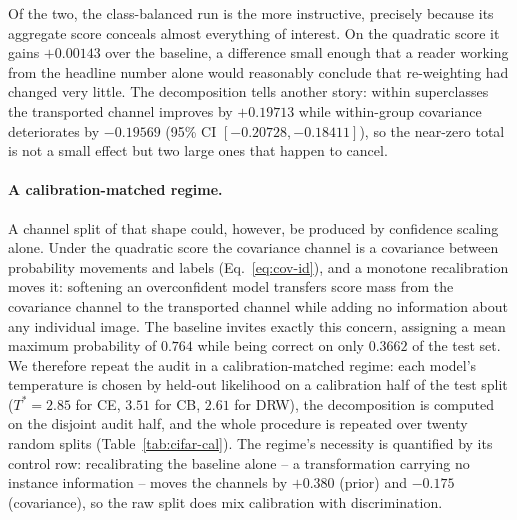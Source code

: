 Of the two, the class-balanced run is the more instructive, precisely because its
aggregate score conceals almost everything of interest. On the quadratic score it gains
$+0.00143$ over the baseline, a difference small enough that a reader working from the
headline number alone would reasonably conclude that re-weighting had changed very
little. The decomposition tells another story: within superclasses the
transported channel improves by $+0.19713$ while within-group covariance deteriorates
by $-0.19569$ (95\% CI $[-0.20728,-0.18411]$), so the near-zero total is not a small
effect but two large ones that happen to cancel.

\paragraph{A calibration-matched regime.} A channel split of that shape could, however,
be produced by confidence scaling alone. Under the quadratic score the covariance channel
is a covariance between probability movements and labels
(Eq.~\eqref{eq:cov-id}), and a monotone recalibration moves it: softening an
overconfident model transfers score mass from the covariance channel to the transported channel while
adding no information about any individual image. The baseline invites exactly this
concern, assigning a mean maximum probability of $0.764$ while being correct on only
$0.3662$ of the test set. We therefore repeat the audit in a calibration-matched regime:
each model's temperature is chosen by held-out likelihood on a calibration half of the
test split ($T^*=2.85$ for CE, $3.51$ for CB, $2.61$ for DRW), the decomposition is
computed on the disjoint audit half, and the whole procedure is repeated over twenty
random splits (Table~\ref{tab:cifar-cal}). The regime's necessity is quantified by its
control row: recalibrating the baseline alone -- a transformation carrying no instance
information -- moves the channels by $+0.380$ (prior) and $-0.175$ (covariance), so the
raw split does mix calibration with discrimination.

